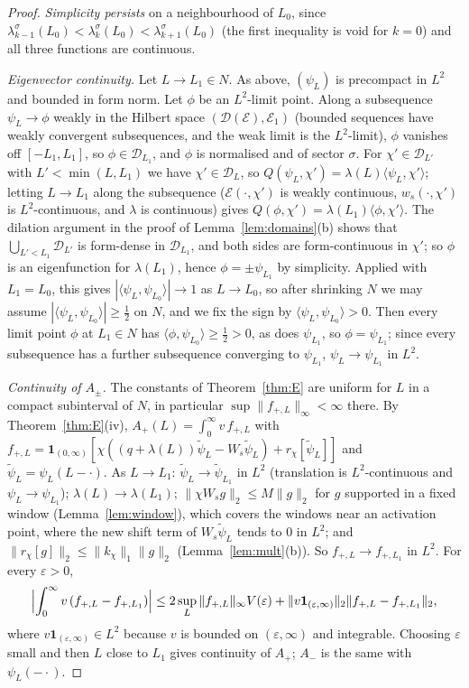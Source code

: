 \documentclass[11pt]{amsart}
\newcommand{\cE}{\mathcal{E}}
\newcommand{\one}{\mathbf{1}}
\newcommand{\eps}{\varepsilon}
\theoremstyle{definition}
\theoremstyle{remark}
\numberwithin{equation}{section}
\begin{document}
\begin{proof}
\emph{Simplicity persists} on a neighbourhood of $L_0$, since $\lambda^\sigma_{k-1}(L_0)<\lambda^\sigma_k(L_0)<\lambda^\sigma_{k+1}(L_0)$ (the first inequality is void for $k=0$) and all three functions are continuous.

\emph{Eigenvector continuity.} Let $L\to L_1\in N$. As above, $(\psi_L)$ is precompact in $L^2$ and bounded in form norm. Let $\phi$ be an $L^2$-limit point. Along a subsequence $\psi_L\to\phi$ weakly in the Hilbert space $(\mathcal D(\cE),\cE_1)$ (bounded sequences have weakly convergent subsequences, and the weak limit is the $L^2$-limit), $\phi$ vanishes off $[-L_1,L_1]$, so $\phi\in\mathcal D_{L_1}$, and $\phi$ is normalised and of sector $\sigma$. For $\chi'\in\mathcal D_{L'}$ with $L'<\min(L,L_1)$ we have $\chi'\in\mathcal D_L$, so $Q(\psi_L,\chi')=\lambda(L)\langle\psi_L,\chi'\rangle$; letting $L\to L_1$ along the subsequence ($\cE(\cdot,\chi')$ is weakly continuous, $w_s(\cdot,\chi')$ is $L^2$-continuous, and $\lambda$ is continuous) gives $Q(\phi,\chi')=\lambda(L_1)\langle\phi,\chi'\rangle$. The dilation argument in the proof of Lemma~\ref{lem:domains}(b) shows that $\bigcup_{L'<L_1}\mathcal D_{L'}$ is form-dense in $\mathcal D_{L_1}$, and both sides are form-continuous in $\chi'$; so $\phi$ is an eigenfunction for $\lambda(L_1)$, hence $\phi=\pm\psi_{L_1}$ by simplicity. Applied with $L_1=L_0$, this gives $|\langle\psi_L,\psi_{L_0}\rangle|\to1$ as $L\to L_0$, so after shrinking $N$ we may assume $|\langle\psi_L,\psi_{L_0}\rangle|\ge\frac12$ on $N$, and we fix the sign by $\langle\psi_L,\psi_{L_0}\rangle>0$. Then every limit point $\phi$ at $L_1\in N$ has $\langle\phi,\psi_{L_0}\rangle\ge\frac12>0$, as does $\psi_{L_1}$, so $\phi=\psi_{L_1}$; since every subsequence has a further subsequence converging to $\psi_{L_1}$, $\psi_L\to\psi_{L_1}$ in $L^2$.

\emph{Continuity of $A_\pm$.} The constants of Theorem~\ref{thm:E} are uniform for $L$ in a compact subinterval of $N$, in particular $\sup\|f_{+,L}\|_\infty<\infty$ there. By Theorem~\ref{thm:E}(iv), $A_+(L)=\int_0^\infty v\,f_{+,L}$ with $f_{+,L}=\one_{(0,\infty)}[\chi((q+\lambda(L))\tilde\psi_L-W_s\tilde\psi_L)+r_\chi[\tilde\psi_L]]$ and $\tilde\psi_L=\psi_L(L-\cdot)$. As $L\to L_1$: $\tilde\psi_L\to\tilde\psi_{L_1}$ in $L^2$ (translation is $L^2$-continuous and $\psi_L\to\psi_{L_1}$); $\lambda(L)\to\lambda(L_1)$; $\|\chi W_sg\|_2\le M\|g\|_2$ for $g$ supported in a fixed window (Lemma~\ref{lem:window}), which covers the windows near an activation point, where the new shift term of $W_s\tilde\psi_L$ tends to $0$ in $L^2$; and $\|r_\chi[g]\|_2\le\|k_\chi\|_1\|g\|_2$ (Lemma~\ref{lem:mult}(b)). So $f_{+,L}\to f_{+,L_1}$ in $L^2$. For every $\eps>0$,
\[
\Bigl|\int_0^\infty v\,(f_{+,L}-f_{+,L_1})\Bigr|\le2\sup_L\|f_{+,L}\|_\infty V(\eps)+\|v\one_{(\eps,\infty)}\|_2\|f_{+,L}-f_{+,L_1}\|_2 ,
\]
where $v\one_{(\eps,\infty)}\in L^2$ because $v$ is bounded on $(\eps,\infty)$ and integrable. Choosing $\eps$ small and then $L$ close to $L_1$ gives continuity of $A_+$; $A_-$ is the same with $\psi_L(-\cdot)$.
\end{proof}
\end{document}
